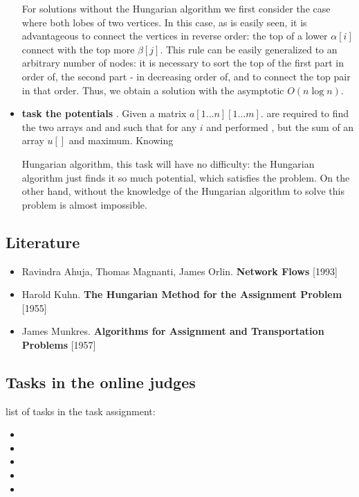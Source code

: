 \begin{itemize}
For solutions without the Hungarian algorithm we first consider the case where both lobes of two vertices. In this case, as is easily seen, it is advantageous to connect the vertices in reverse order: the top of a lower $\alpha[i]$ connect with the top more $\beta[j]$. This rule can be easily generalized to an arbitrary number of nodes: it is necessary to sort the top of the first part in order of, the second part - in decreasing order of, and to connect the top pair in that order. Thus, we obtain a solution with the asymptotic $O (n \log n)$.

\item \textbf{ task the potentials }. Given a matrix $a[1 \ldots n][1 \ldots m]$. are required to find the two arrays  and and   such that for any $i$ and  performed , but the sum of an array $u []$ and   maximum. Knowing

Hungarian algorithm, this task will have no difficulty: the Hungarian algorithm just finds it so much potential, which satisfies the problem. On the other hand, without the knowledge of the Hungarian algorithm to solve this problem is almost impossible.

\end{itemize}

\subsection{ Literature }

\begin{itemize}

\item Ravindra Ahuja, Thomas Magnanti, James Orlin. \textbf{ Network Flows } [1993] \item Harold Kuhn. \textbf{ The Hungarian Method for the Assignment Problem } [1955] \item James Munkres. \textbf{ Algorithms for Assignment and Transportation Problems } [1957] \end{itemize}

\subsection{ Tasks in the online judges }

list of tasks in the task assignment:

\begin{itemize}

\item

\item

\item

\item

\item

\end{itemize}

